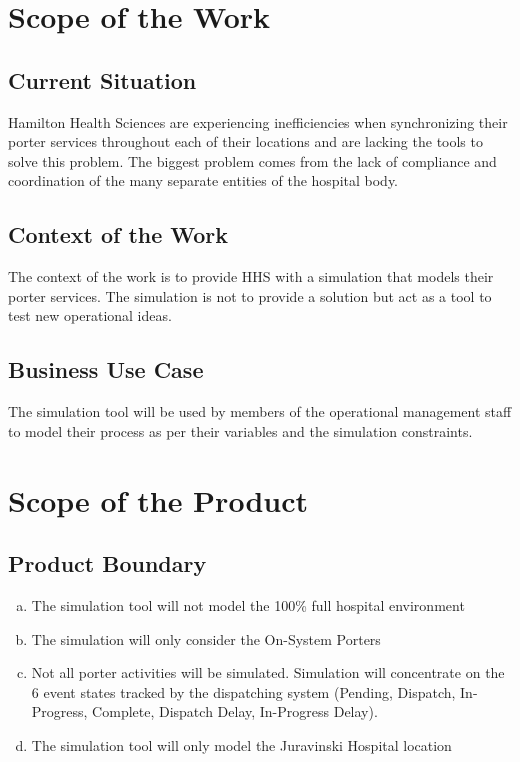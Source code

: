 \documentclass[paper=letter, fontsize=10pt]{scrartcl}
\numberwithin{equation}{section}		%
\numberwithin{figure}{section}			%
\numberwithin{table}{section}				%
\begin{document}
\section{Scope of the Work}
\subsection{Current Situation}
Hamilton Health Sciences are experiencing inefficiencies when synchronizing their porter services throughout each of their locations and are lacking the tools to solve this problem. The biggest problem comes from the lack of compliance and coordination of the many separate entities of the hospital body.
\subsection{Context of the Work}
The context of the work is to provide HHS with a simulation that models their porter services. The simulation is not to provide a solution but act as a tool to test new operational ideas.
\subsection{Business Use Case}
The simulation tool will be used by members of the operational management staff to model their process as per their variables and the simulation constraints.

\section{Scope of the Product}
\subsection{Product Boundary}
\begin{enumerate}[(a)]
	\item The simulation tool will not model the 100\% full hospital environment
	\item The simulation will only consider the On-System Porters
	\item Not all porter activities will be simulated. Simulation will concentrate on the 6 event states tracked by the dispatching system (Pending, Dispatch, In-Progress, Complete, Dispatch Delay, In-Progress Delay).
	\item The simulation tool will only model the Juravinski Hospital location  
\end{enumerate} 
\end{document}
